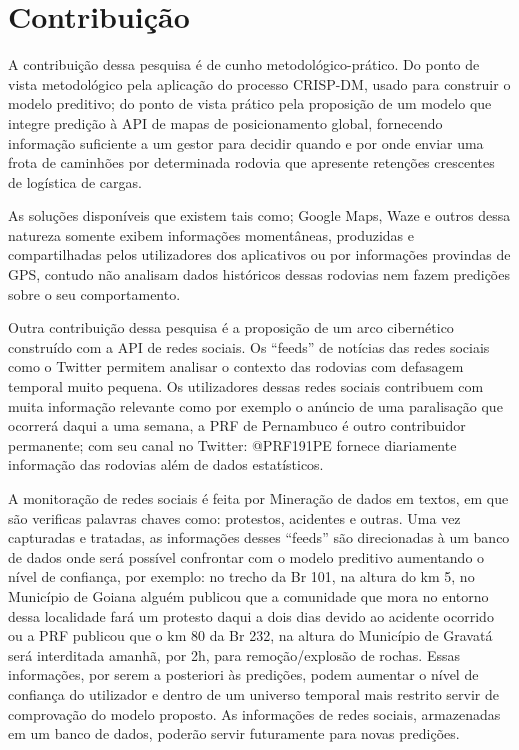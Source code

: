 \chapter{Contribuição}\label{meto}

A contribuição dessa pesquisa é de cunho metodológico-prático.
Do ponto de vista metodológico pela aplicação do processo CRISP-DM, usado para construir o modelo preditivo; do ponto de vista prático 
pela proposição de um modelo que integre predição à API de mapas de posicionamento global, fornecendo informação suficiente a um gestor para decidir quando 
e por onde enviar uma frota de caminhões por determinada rodovia que apresente retenções crescentes de logística de cargas. 

As soluções disponíveis que existem tais como; Google Maps, Waze e outros dessa natureza somente exibem informações momentâneas, produzidas e compartilhadas pelos utilizadores 
dos aplicativos ou por informações provindas de GPS, contudo não analisam dados históricos dessas rodovias nem fazem predições sobre o seu comportamento.

Outra contribuição dessa pesquisa é a proposição de um arco cibernético construído com a API de redes sociais.
Os ``feeds'' de notícias das redes sociais como o Twitter permitem analisar o contexto das rodovias com defasagem temporal muito pequena.
Os utilizadores dessas redes sociais contribuem com muita informação relevante como por exemplo o anúncio de uma paralisação que ocorrerá 
daqui a uma semana, a PRF de Pernambuco é outro contribuidor permanente; com seu canal no Twitter: @PRF191PE fornece diariamente informação das rodovias 
além de dados estatísticos. 

A monitoração de redes sociais é feita por Mineração de dados em textos, em que são verificas palavras chaves como: protestos, acidentes e outras.
Uma vez capturadas e tratadas, as informações desses ``feeds'' são direcionadas à um banco de dados onde será possível confrontar com o 
modelo preditivo aumentando o nível de confiança, por exemplo: no trecho da Br 101, na altura do km 5, no Município de Goiana alguém publicou
que a comunidade que mora no entorno dessa localidade fará um protesto daqui a dois dias devido ao acidente ocorrido ou a PRF publicou que o km 80
da Br 232, na altura do Município de Gravatá será interditada amanhã, por 2h, para remoção/explosão de rochas. 
Essas informações, por serem a posteriori às predições, podem aumentar o nível de confiança do utilizador e dentro de um universo temporal 
mais restrito servir de comprovação do modelo proposto.
As informações de redes sociais, armazenadas em um banco de dados, poderão servir futuramente para novas predições.

